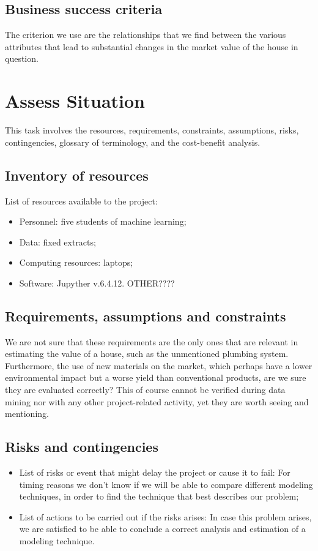 \subsection{Business success criteria}
The criterion we use are the relationships that we find between the various attributes that lead to substantial changes in the market value of the house in question.



\section{Assess Situation}
This task involves the resources, requirements, constraints, assumptions, risks, contingencies, glossary of terminology, and the cost-benefit analysis.

\subsection{Inventory of resources}
List of resources available to the project:
\begin{itemize}
\item Personnel: five students of machine learning; 
\item Data: fixed extracts;
\item Computing resources: laptops;
\item Software: Jupyther v.6.4.12. OTHER????
\end{itemize}

\subsection{Requirements, assumptions and constraints}
We are not sure that these requirements are the only ones that are relevant in estimating the value of a house, such as the unmentioned plumbing system. Furthermore, the use of new materials on the market, which perhaps have a lower environmental impact but a worse yield than conventional products, are we sure they are evaluated correctly? This of course cannot be verified during data mining nor with any other project-related activity, yet they are worth seeing and mentioning.

\subsection{Risks and contingencies}
\begin{itemize}
\item List of risks or event that might delay the project or cause it to fail: For timing reasons we don't know if we will be able to compare different modeling techniques, in order to find the technique that best describes our problem; 
\item List of actions to be carried out if the risks arises: In case this problem arises, we are satisfied to be able to conclude a correct analysis and estimation of a modeling technique.
\end{itemize}	

